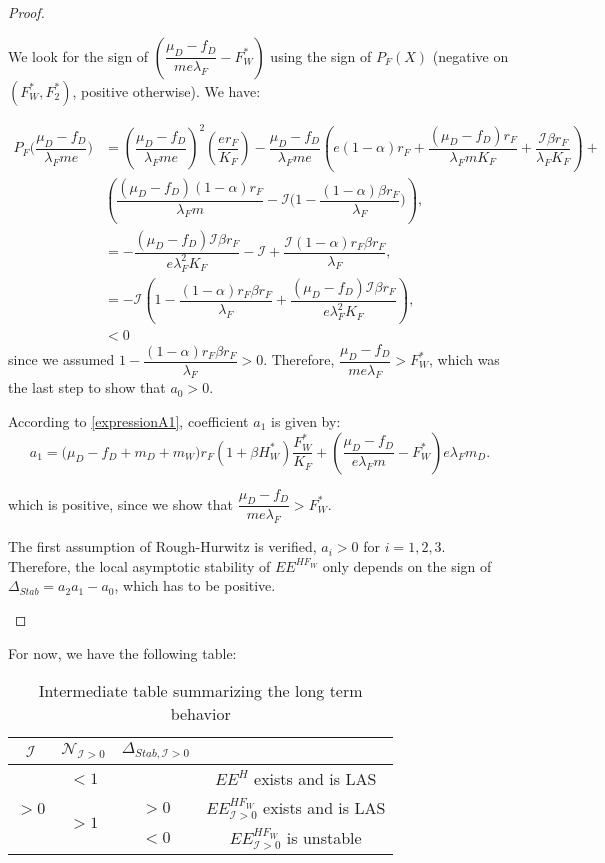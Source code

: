 \documentclass{article}
\newcommand{\lfw}{\lambda_{F}}
\newcommand{\lfw}{\lambda_{F}}
\newcommand{\cI}{\mathcal{I}}
\begin{document}
\begin{proof}
\begin{itemize}
We look for the sign of $\left(\dfrac{\mu_D -f_D}{m e\lfw} - F^*_{W}\right)$ using the sign of $P_F(X)$ (negative on $(F^*_W, F^*_2)$, positive otherwise). We have:

\begin{align*}
P_F\Big(\dfrac{\mu_D - f_D}{\lfw m e}\Big) &= \left(\dfrac{\mu_D - f_D}{\lfw m e}\right)^2 \left(\dfrac{er_F}{K_F} \right) - \dfrac{\mu_D - f_D}{\lfw m e} \left(e(1-\alpha)r_F + \dfrac{(\mu_D - f_D) r_F}{\lfw m K_F} + \dfrac{\cI \beta r_F}{\lfw K_F} \right) + \\ & \left(\dfrac{(\mu_D - f_D)(1-\alpha) r_F}{\lfw m} - \cI\Big(1 - \dfrac{(1-\alpha)\beta r_F}{\lfw} \Big) \right), \\
&= - \dfrac{(\mu_D - f_D) \cI \beta r_F}{e \lfw ^2 K_F} - \cI + \dfrac{\cI (1-\alpha)r_F \beta r_F}{\lfw}, \\
&= -\cI \left( 1 - \dfrac{(1-\alpha)r_F \beta r_F}{\lfw} + \dfrac{(\mu_D - f_D) \cI \beta r_F}{e \lfw ^2 K_F} \right), \\
& < 0
\end{align*}
since we assumed $1 - \dfrac{(1-\alpha)r_F \beta r_F}{\lfw} > 0$. Therefore, $\dfrac{\mu_D - f_D}{m e\lfw} > F^*_{W}$, which was the last step to show that $a_0>0$. 

According to \eqref{expressionA1}, coefficient $a_1$ is given by:
\begin{equation*}
a_1 = \big( \mu_D  -f_D + m_D + m_W) r_F(1+ \beta H_W^*) \dfrac{F^*_W}{K_F} + \left(\dfrac{\mu_D -f_D}{e\lfw m} - F_W^*\right) e \lfw m_D .
\end{equation*}

which is positive, since we show that $\dfrac{\mu_D - f_D}{m e\lfw} > F^*_{W}$.

The first assumption of Rough-Hurwitz is verified, $a_i > 0$ for $i=1,2,3$. Therefore, the local asymptotic stability of $EE^{HF_W}$ only depends on the sign of $\Delta_{Stab}= a_2 a_1 - a_0$, which has to be positive.

\end{itemize}





\end{proof}

For now, we have the following table:
\begin{table}[ht!]
\def\arraystretch{2}
\centering
\begin{tabular}{c|c|c|c}
$\cI$ & $\mathcal{N}_{\cI > 0} $ & $\Delta_{Stab, \cI > 0}$ & \\
\hline
\multirow{3}{*}{$>0$} & $<1$ & &$EE^{H}$ exists and is LAS \\
\cline{2-4}
 & \multirow{2}{*}{$> 1$}  & $>0$ &$EE^{HF_W}_{\cI>0}$ exists and is LAS\\
 \cline{3-4}
 & & $ < 0$ & $EE^{HF_W}_{\cI>0}$ is unstable \\
\end{tabular}
\caption{Intermediate table summarizing the long term behavior}
\end{table}
\end{document}
